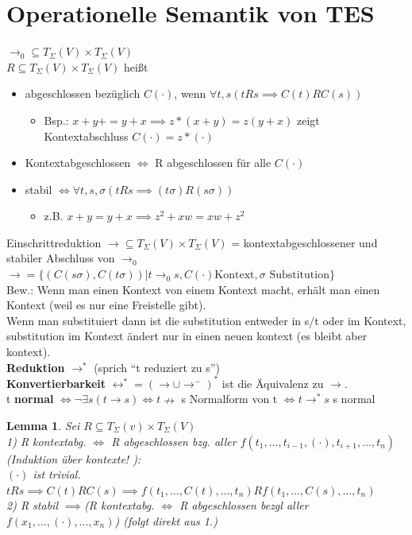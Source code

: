 \documentclass{article}
\newcommand{\nto}{\nrightarrow}
\newtheorem{lemma}{Lemma}[section]
\theoremstyle{definition}
\begin{document}
	\section{Operationelle Semantik von TES}
	$\to_0\subseteq T_\Sigma(V)\times T_\Sigma(V)$\\
	$R\subseteq T_\Sigma(V)\times T_\Sigma(V)$ heißt
	\begin{itemize}
		\item abgeschlossen bezüglich $C(\cdot)$, wenn $\forall t,s (tRs\implies C(t)RC(s))$
		\begin{itemize}\item Bsp.: $x+y+=y+x\implies z*(x+y)=z(y+x)$ zeigt Kontextabschluss $C(\cdot)=z*(\cdot)$\end{itemize}
		\item Kontextabgeschlossen $\iff$ R abgeschlossen für alle $C(\cdot)$
		\item stabil $\iff \forall t,s,\sigma (tRs\implies (t\sigma)R(s\sigma))$
		\begin{itemize} \item z.B. $x+y=y+x\implies z^2+xw=xw+z^2$\end{itemize}
	\end{itemize}
	Einschrittreduktion $\to\subseteq T_\Sigma(V)\times T_\Sigma(V)$ = kontextabgeschlossener und stabiler Abschluss von $\to_0$\\
	$\to = \{(C(s\sigma), C(t\sigma))|t\to_0s, C(\cdot) \text{Kontext}, \sigma \text{ Substitution}\}$\\
	Bew.: Wenn man einen Kontext von einem Kontext macht, erhält man einen Kontext (weil es nur eine Freistelle gibt).\\
	Wenn man substituiert dann ist die substitution entweder in s/t oder im Kontext, substitution im Kontext ändert nur in einen neuen kontext (es bleibt aber kontext).\\
	\textbf{Reduktion} $\to^*$ (sprich ``t reduziert zu s'')\\
	\textbf{Konvertierbarkeit} $\leftrightarrow^*= (\to\cup\to^-)^*$ ist die Äquivalenz zu $\to$.\\
	t \textbf{normal} $\iff\lnot \exists s(t\to s)\iff t\nto$ 
	s Normalform von t $\iff t\to^* s$ s normal\\
	\begin{lemma}
	Sei $R\subseteq T_\Sigma(v)\times T_\Sigma(V)$\\
	1) R kontextabg. $\iff$ R abgeschlossen bzg. aller $f(t_1,\dots, t_{i-1},(\cdot), t_{i+1},\dots,t_n)$
	(Induktion über kontexte! ):\\
	$(\cdot)$ ist trivial.\\
	$ tRs\implies C(t) R C(s)\implies f(t_1,\dots,C(t),\dots, t_n)R f(t_1,\dots,C(s),\dots, t_n)$\\
	2) R stabil $\implies $(R kontextabg. $\iff$ R abgeschlossen bezgl aller $f(x_1, \dots, (\cdot), \dots, x_n)$) (folgt direkt aus 1.)
	\end{lemma}
\end{document}
